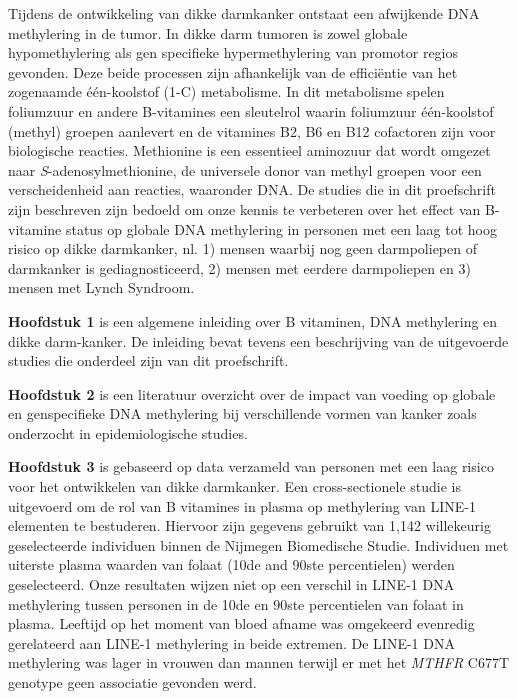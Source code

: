 \noindent Tijdens de ontwikkeling van dikke darmkanker ontstaat een afwijkende DNA methylering in de tumor. In dikke darm tumoren is zowel globale hypomethylering als gen specifieke hypermethylering van promotor regios gevonden. Deze beide processen zijn afhankelijk van de effici\"entie van het zogenaamde \'e\'en-koolstof (1-C) metabolisme. In dit metabolisme spelen foliumzuur en andere B-vitamines een sleutelrol waarin foliumzuur \'e\'en-koolstof (methyl) groepen aanlevert en de vitamines B2, B6 en B12 cofactoren zijn voor biologische reacties. Methionine is een essentieel aminozuur dat wordt omgezet naar \emph{S}-adenosylmethionine, de universele donor van methyl groepen voor een verscheidenheid aan reacties, waaronder DNA. De studies die in dit proefschrift zijn beschreven zijn bedoeld om onze kennis te verbeteren over het effect van B-vitamine status op globale DNA methylering in personen met een laag tot hoog risico op dikke darmkanker, nl. 1) mensen waarbij nog geen darmpoliepen of darmkanker is gediagnosticeerd, 2) mensen met eerdere darmpoliepen en 3) mensen met Lynch Syndroom.

\noindent \textbf{Hoofdstuk 1} is een algemene inleiding over B vitaminen, DNA methylering en dikke darm-kanker. De inleiding bevat tevens een beschrijving van de uitgevoerde studies die onderdeel zijn van dit proefschrift.

\noindent \textbf{Hoofdstuk 2} is een literatuur overzicht over de impact van voeding op globale en genspecifieke DNA methylering bij verschillende vormen van kanker zoals onderzocht in epidemiologische studies.

\noindent \textbf{Hoofdstuk 3} is gebaseerd op data verzameld van personen met een laag risico voor het ontwikkelen van dikke darmkanker. Een cross-sectionele studie is uitgevoerd om de rol van B vitamines in plasma op methylering van LINE-1 elementen te bestuderen. Hiervoor zijn gegevens gebruikt van 1,142 willekeurig geselecteerde individuen binnen de Nijmegen Biomedische Studie. Individuen met uiterste plasma waarden van folaat (10de and 90ste percentielen) werden geselecteerd. Onze resultaten wijzen niet op een verschil in LINE-1 DNA methylering tussen personen in de 10de en 90ste percentielen van folaat in plasma. Leeftijd op het moment van bloed afname was omgekeerd evenredig gerelateerd aan LINE-1 methylering in beide extremen. De LINE-1 DNA methylering was lager in vrouwen dan mannen terwijl er met het \emph{MTHFR} C677T genotype geen associatie gevonden werd.

